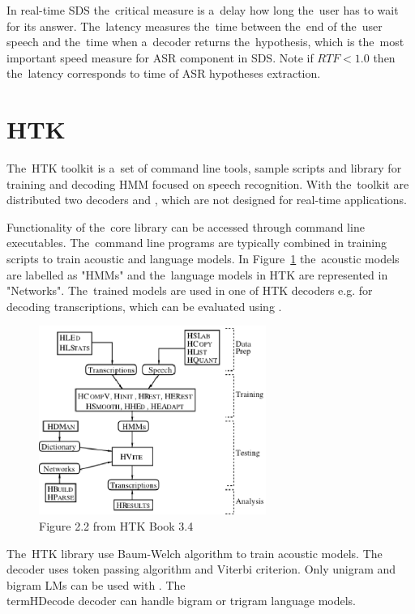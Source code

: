 In real-time \ac{SDS} the~critical measure is a~delay how long the~user has to wait for its answer.
The~latency measures the~time between the~end of the~user speech and the~time when a~decoder returns the~hypothesis, which is the~most important speed measure for \ac{ASR} component in \ac{SDS}.
Note if $RTF < 1.0$ then the~latency corresponds to time of \ac{ASR} hypotheses extraction.


\section{\ac{HTK}}
\label{sec:back_htk}
The~\ac{HTK} toolkit is a~set of command line tools, sample scripts and library for training and decoding \ac{HMM} focused on speech recognition.
With the~toolkit are distributed two decoders  and , which are not designed for real-time applications.

Functionality of the~core library can be accessed through command line executables.
The~command line programs are typically combined in training scripts to train acoustic and language models.
In Figure~\ref{fig:htk_tools} the~acoustic models are labelled as "HMMs" and the~language models in \ac{HTK} are represented in "Networks".
The~trained models are used in one of \ac{HTK} decoders e.g.  for decoding transcriptions, which can be evaluated using .

\begin{figure}[!htp]
    \begin{center}
    \includegraphics[width=20em]{images/htk_tools.ps}
    \caption{Figure 2.2 from HTK Book 3.4\cite{young2006htk}}
    \label{fig:htk_tools} 
    \end{center}
\end{figure}

The~\ac{HTK} library use Baum-Welch algorithm to train acoustic models.
The~ decoder uses token passing algorithm and Viterbi criterion.\cite{young2006htk} %
Only unigram and bigram \acp{LM} can be used with .
The~\\term{HDecode} decoder can handle bigram or trigram language models. 


